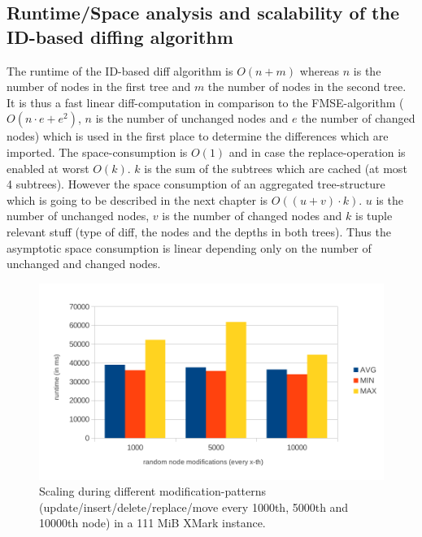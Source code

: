 \subsection{Runtime/Space analysis and scalability of the ID-based diffing algorithm}
The runtime of the ID-based diff algorithm is $O(n+m)$ whereas $n$ is the number of nodes in the first tree and $m$ the number of nodes in the second tree. It is thus a fast linear diff-computation in comparison to the FMSE-algorithm ($O(n \cdot e + e^2)$, $n$ is the number of unchanged nodes and $e$ the number of changed nodes) which is used in the first place to determine the differences which are imported. The space-consumption is $O(1)$ and in case the replace-operation is enabled at worst $O(k)$. $k$ is the sum of the subtrees which are cached (at most 4 subtrees). However the space consumption of an aggregated tree-structure which is going to be described in the next chapter is $O((u + v) \cdot k)$. $u$ is the number of unchanged nodes, $v$ is the number of changed nodes and $k$ is tuple relevant stuff (type of diff, the nodes and the depths in both trees). Thus the asymptotic space consumption is linear depending only on the number of unchanged and changed nodes.

\begin{figure}[tb]
\centering
\includegraphics[width=\textwidth]{figures/100MB-scaling}
\caption{Scaling during different modification-patterns (update/insert/delete/replace/move every 1000th, 5000th and 10000th node) in a 111 MiB XMark instance.} 
\label{fig:100MBscaling}
\end{figure}

